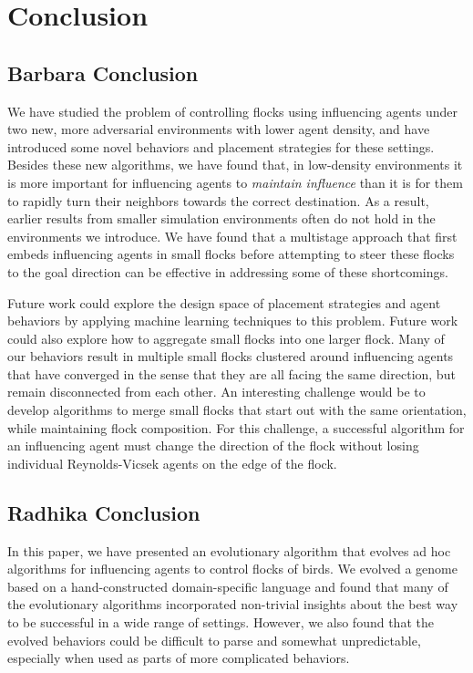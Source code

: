 \chapter{Conclusion}
\label{ch:conclusion}

\section{Barbara Conclusion}
We have studied the problem of controlling flocks using influencing agents
under two new, more adversarial environments with lower agent density, and
have introduced some novel behaviors and placement strategies for these settings.
Besides these new algorithms, we have found that, in low-density
environments it is more important for influencing agents to
\textit{maintain influence} than it is for them to rapidly turn their
neighbors towards the correct destination.
As a result, earlier results from smaller simulation environments often do
not hold in the environments we introduce.
We have found that a multistage approach that first embeds influencing
agents in small flocks before attempting to steer these flocks to the goal
direction can be effective in addressing some of these shortcomings.

Future work could explore the design space of placement strategies and agent
behaviors by applying machine learning techniques to this problem.
Future work could also explore how to aggregate small flocks into one larger
flock.
Many of our behaviors result in multiple small flocks clustered around
influencing agents that have converged in the sense that they are all facing the
same direction, but remain disconnected from each other.
An interesting challenge would be to develop algorithms to merge small flocks that
start out with the same orientation, while maintaining flock composition.
For this challenge, a successful algorithm for an influencing agent must change
the direction of the flock without losing individual Reynolds-Vicsek agents on
the edge of the flock.

\section{Radhika Conclusion}
In this paper, we have presented an evolutionary algorithm that evolves
ad hoc algorithms for influencing agents to control flocks of birds.
We evolved a genome based on a hand-constructed domain-specific language
and found that many of the evolutionary algorithms incorporated non-trivial
insights about the best way to be successful in a wide range of settings.
However, we also found that the evolved behaviors could be difficult to 
parse and somewhat unpredictable, especially when used as parts of more
complicated behaviors.

